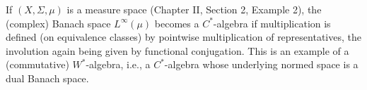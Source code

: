 If $(X, \Sigma, \mu)$ is a measure space (Chapter II, Section 2, Example 2), the (complex) Banach space $L^\infty(\mu)$ becomes a $C^*$-algebra if multiplication is defined (on equivalence classes) by pointwise multiplication of representatives, the involution again being given by functional conjugation. This is an example of a (commutative) $W^*$-algebra, i.e., a $C^*$-algebra whose underlying normed space is a dual Banach space.

